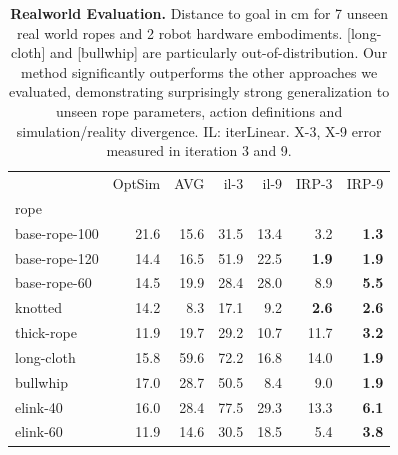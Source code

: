\begin{table}[t]
\centering
    \setlength\tabcolsep{4pt}    
    \begin{tabular}{l|rrrrrr}
    \toprule
    {} &  OptSim &  AVG &  il-3 &  il-9 &  IRP-3 &  IRP-9 \\
    rope          &         &      &       &       &        &        \\
    \midrule
    base-rope-100 &    21.6 & 15.6 &  31.5 &  13.4 &    3.2 &    \textbf{1.3} \\
    base-rope-120 &    14.4 & 16.5 &  51.9 &  22.5 &    \textbf{1.9} &    \textbf{1.9} \\
    base-rope-60  &    14.5 & 19.9 &  28.4 &  28.0 &    8.9 &    \textbf{5.5} \\
    knotted       &    14.2 &  8.3 &  17.1 &   9.2 &    \textbf{2.6} &    \textbf{2.6} \\
    thick-rope    &    11.9 & 19.7 &  29.2 &  10.7 &   11.7 &    \textbf{3.2} \\
    long-cloth    &    15.8 & 59.6 &  72.2 &  16.8 &   14.0 &    \textbf{1.9} \\
    bullwhip      &    17.0 & 28.7 &  50.5 &   8.4 &    9.0 &    \textbf{1.9} \\
    \midrule
    elink-40      &    16.0 & 28.4 &  77.5 &  29.3 &   13.3 &    \textbf{6.1} \\
    elink-60      &    11.9 & 14.6 &  30.5 &  18.5 &    5.4 &    \textbf{3.8} \\
    \bottomrule
    \end{tabular}

    \caption{\textbf{Realworld Evaluation.} Distance to goal in cm for 7 unseen real world ropes and 2 robot hardware embodiments. [long-cloth] and [bullwhip] are particularly out-of-distribution. Our method significantly outperforms the other approaches we evaluated, demonstrating surprisingly strong generalization to unseen rope parameters, action definitions and simulation/reality divergence. IL: iterLinear. X-3, X-9 error measured in iteration 3 and 9.} \vspace{-4mm}
    \label{tab:real_eval} 
\end{table}



